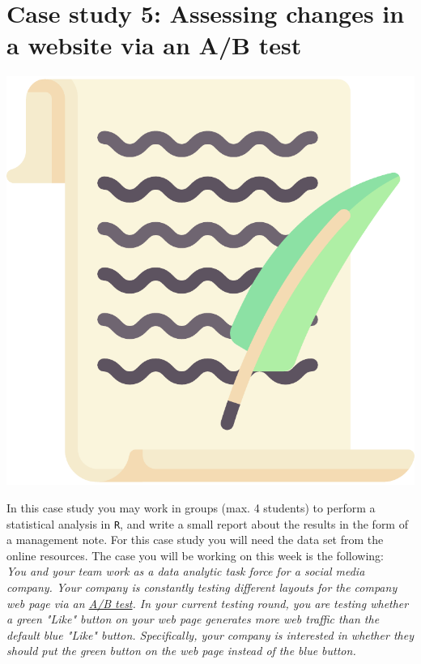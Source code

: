
\begin{minipage}{0.8\textwidth}
\section{Case study 5: Assessing changes in a website via an A/B test}
\end{minipage}%
\hfill%
\begin{minipage}{0.1\textwidth}
\includegraphics[width=\linewidth]{Files/Images/lettericon.pdf}
\end{minipage}
\vspace*{.1cm}

In this case study you may work in groups (max. 4 students) to perform a statistical analysis in \texttt{R}, and write a small report about the results in the form of a management note. For this case study you will need the data set  from the online resources. The case you will be working on this week is the following: \\

\textit{You and your team work as a data analytic task force for a social media company. Your company is constantly testing different layouts for the company web page via an \href{https://en.wikipedia.org/wiki/A/B_testing}{A/B test}. In your current testing round, you are testing whether a green "Like" button on your web page generates more web traffic than the default blue "Like" button. Specifically, your company is interested in whether they should put the green button on the web page instead of the blue button.} \\

